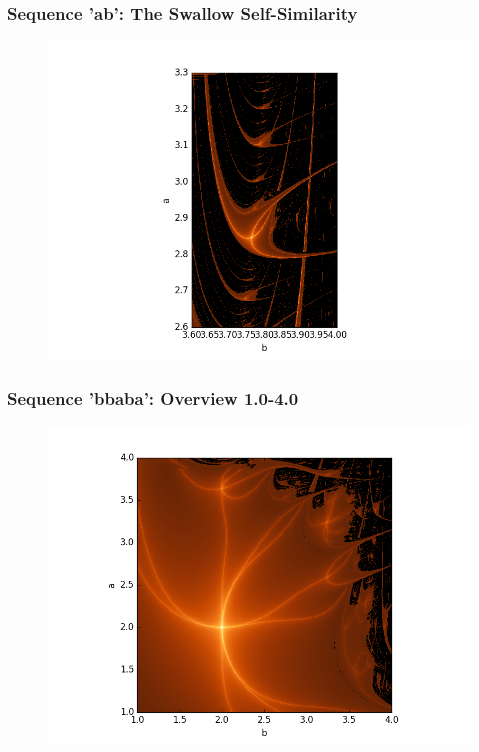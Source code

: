 \documentclass[ignorenonframetext]{beamer}
\begin{document}
\begin{frame}
\frametitle{Sequence 'ab': The Swallow Self-Similarity}
\begin{figure}[htbp]
\includegraphics[scale = 0.5]{pictures/The-swallow-ab-self.png}
\end{figure}
\end{frame}

\begin{frame}
\frametitle{Sequence 'bbaba': Overview 1.0-4.0}
\begin{figure}[htbp]
\includegraphics[scale = 0.5]{pictures/Overview_bbaba.png}
\end{figure}
\end{frame}
\end{document}
